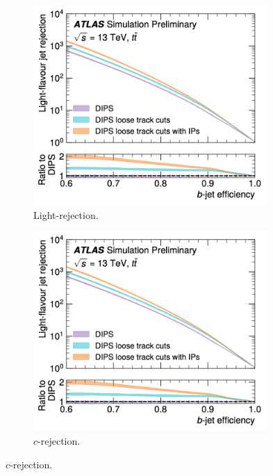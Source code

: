 \begin{figure}[h!]
  \centering
  \begin{subfigure}[b]{0.48\textwidth}
      \centering
      \includegraphics[width=0.98\textwidth]{Images/FTAG/dipsOptL.png}
      \caption{Light-rejection.} 
      \label{fig:dipsOptRocL}
  \end{subfigure}
  \hfill
  \begin{subfigure}[b]{0.48\textwidth}
      \centering
      \includegraphics[width=0.98\textwidth]{Images/FTAG/dipsOptL.png}
      \caption{$c$-rejection.} 

\end{subfigure}
\end{figure}
